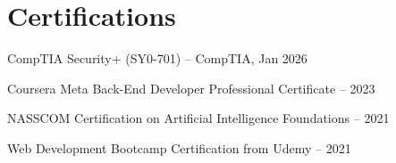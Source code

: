 \documentclass[a4paper,11pt]{article}
\begin{document}
\section{Certifications}
\begin{description}[font=$\bullet$,leftmargin=*]
  \item {CompTIA Security+ (SY0-701) -- CompTIA, Jan 2026}
  \vspace{-5pt}
  \item {Coursera Meta Back-End Developer Professional Certificate -- 2023}
  \vspace{-5pt}
  \item {NASSCOM Certification on Artificial Intelligence Foundations -- 2021}
  \vspace{-5pt}
  \item {Web Development Bootcamp Certification from Udemy -- 2021}
\end{description}
\end{document}
